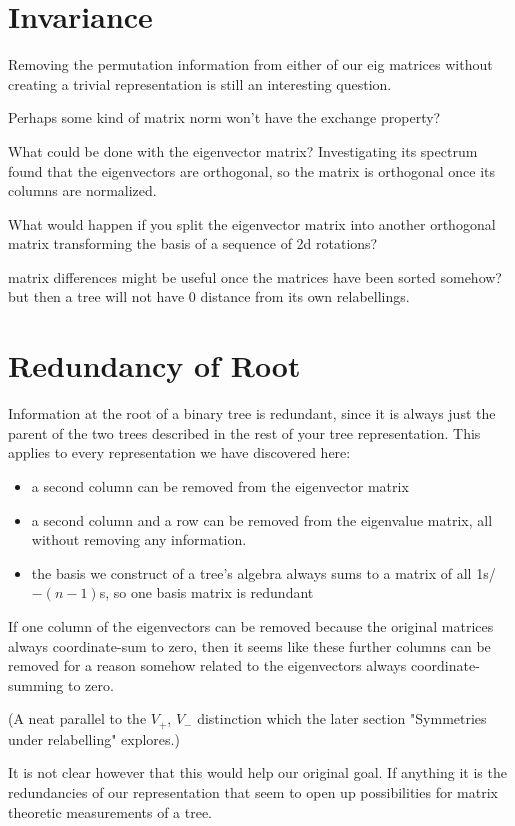 \documentclass[10pt,a4paper]{report}
\begin{document}
\section{Invariance}

Removing the permutation information from either of our eig matrices without creating a trivial representation is still an interesting question.

Perhaps some kind of matrix norm won't have the exchange property?

What could be done with the eigenvector matrix? Investigating its spectrum found that the eigenvectors are orthogonal, so the matrix is orthogonal once its columns are normalized.

What would happen if you split the eigenvector matrix into another orthogonal matrix transforming the basis of a sequence of 2d rotations?

matrix differences might be useful once the matrices have been sorted somehow? but then
a tree will not have 0 distance from its own relabellings.

\section{Redundancy of Root}

Information at the root of a binary tree is redundant, since it is always just the parent of the two trees described in the rest of your tree representation.
This applies to every representation we have discovered here:
\begin{itemize}
	\item a second column can be removed from the eigenvector matrix
	\item a second column and a row can be removed from the eigenvalue matrix, all without removing any information.
	\item the basis we construct of a tree's algebra always sums to a matrix of all 1s/$-(n-1)$s, so one basis matrix is redundant
\end{itemize}

If one column of the eigenvectors can be removed because the original matrices always coordinate-sum to zero, then it seems like these further columns can be removed for a reason somehow related to the eigenvectors always coordinate-summing to zero.

(A neat parallel to the $V_+$, $V_-$ distinction which the later section "Symmetries under relabelling" explores.)

It is not clear however that this would help our original goal. If anything it is the redundancies of our representation that seem to open up possibilities for matrix theoretic measurements of a tree.
\end{document}
